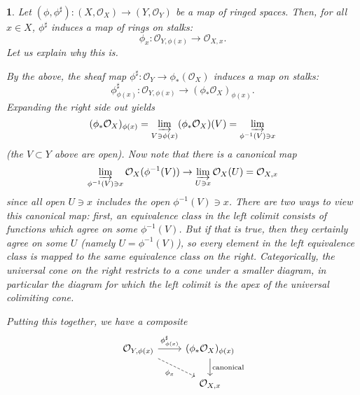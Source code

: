 \documentclass[12pt]{article}
\newtheorem{para}[theorem]{}
\begin{document}
\begin{para}
	Let $(\phi,\phi^\sharp): (X,\mathcal{O}_X)\to (Y,\mathcal{O}_Y)$ be a map of ringed spaces. Then, for all $x\in X$, $\phi^\sharp$ induces a map of rings on stalks: 
	\begin{equation*}
		\phi_x:\mathcal{O}_{Y,\phi(x)} \to \mathcal{O}_{X,x}.
	\end{equation*}
	Let us explain why this is.

	By the above, the sheaf map $\phi^\sharp:\mathcal{O}_Y\to\phi_\ast(\mathcal{O}_X)$ induces a map on stalks:
	\begin{equation*}
		\phi^\sharp_{\phi(x)}: \mathcal{O}_{Y,\phi(x)}\to (\phi_\ast\mathcal{O}_X)_{\phi(x)}.
	\end{equation*}
	Expanding the right side out yields
	\begin{equation*}
		(\phi_\ast\mathcal{O}_X)_{\phi(x)} = \varinjlim_{V\ni\phi(x)} (\phi_\ast\mathcal{O}_X)(V) = \varinjlim_{\phi^{-1}(V)\ni x}
	\end{equation*}
	(the $V\subset Y$ above are open). Now note that there is a canonical map 
	\begin{equation*}
		\varinjlim_{\phi^{-1}(V)\ni x}\mathcal{O}_X(\phi^{-1}(V)) \to \varinjlim_{U\ni x}\mathcal{O}_X(U)=\mathcal{O}_{X,x}
	\end{equation*}
	since all open $U\ni x$ includes the open $\phi^{-1}(V)\ni x$. There are two ways to view this canonical map: first, an equivalence class in the left colimit consists of functions which agree on some $\phi^{-1}(V)$. But if that is true, then they certainly agree on some $U$ (namely $U=\phi^{-1}(V)$), so every element in the left equivalence class is mapped to the same equivalence class on the right. Categorically, the universal cone on the right restricts to a cone under a smaller diagram, in particular the diagram for which the left colimit is the apex of the universal colimiting cone.

	Putting this together, we have a composite 
	\begin{equation*}
\begin{tikzcd}
{\mathcal{O}_{Y,\phi(x)}} \arrow[r, "\phi^\sharp_{\phi(x)}"] \arrow[rd, "\phi_x"', dashed] & (\phi_\ast\mathcal{O}_X)_{\phi(x)} \arrow[d, "\text{canonical}"] \\
                                                                                           & {\mathcal{O}_{X,x}}                                             
\end{tikzcd}
	\end{equation*}


\end{para}
\end{document}
